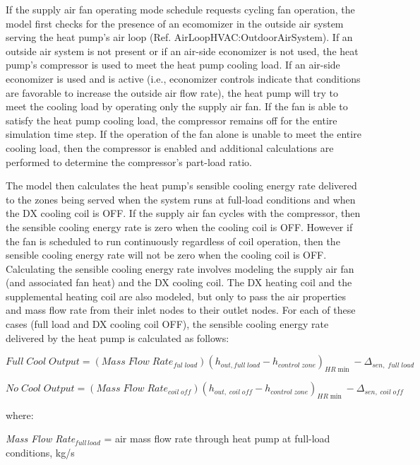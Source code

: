 If the supply air fan operating mode schedule requests cycling fan operation, the model first checks for the presence of an ecomomizer in the outside air system serving the heat pump's air loop (Ref. AirLoopHVAC:OutdoorAirSystem). If an outside air system is not present or if an air-side economizer is not used, the heat pump's compressor is used to meet the heat pump cooling load. If an air-side economizer is used and is active (i.e., economizer controls indicate that conditions are favorable to increase the outside air flow rate), the heat pump will try to meet the cooling load by operating only the supply air fan. If the fan is able to satisfy the heat pump cooling load, the compressor remains off for the entire simulation time step. If the operation of the fan alone is unable to meet the entire cooling load, then the compressor is enabled and additional calculations are performed to determine the compressor's part-load ratio.

The model then calculates the heat pump's sensible cooling energy rate delivered to the zones being served when the system runs at full-load conditions and when the DX cooling coil is OFF. If the supply air fan cycles with the compressor, then the sensible cooling energy rate is zero when the cooling coil is OFF. However if the fan is scheduled to run continuously regardless of coil operation, then the sensible cooling energy rate will not be zero when the cooling coil is OFF. Calculating the sensible cooling energy rate involves modeling the supply air fan (and associated fan heat) and the DX cooling coil. The DX heating coil and the supplemental heating coil are also modeled, but only to pass the air properties and mass flow rate from their inlet nodes to their outlet nodes. For each of these cases (full load and DX cooling coil OFF), the sensible cooling energy rate delivered by the heat pump is calculated as follows:

\begin{equation}
Full\;Cool\;Output = (Mass\;Flow\;Rat{e_{ful\;load}}){({h_{out,full\;load}} - {h_{control\;zone}})_{HR\min }} - {\Delta_{sen,\;full\;load}}
\end{equation}

\begin{equation}
No\;Cool\;Output = (Mass\;Flow\;Rat{e_{coil\;off}}){({h_{out,\;coil\;off}} - {h_{control\;zone}})_{HR\min }} - {\Delta_{sen,\;coil\;off}}
\end{equation}

where:

\emph{Mass Flow Rate\(_{full \, load}\)} = air mass flow rate through heat pump at full-load conditions, kg/s

